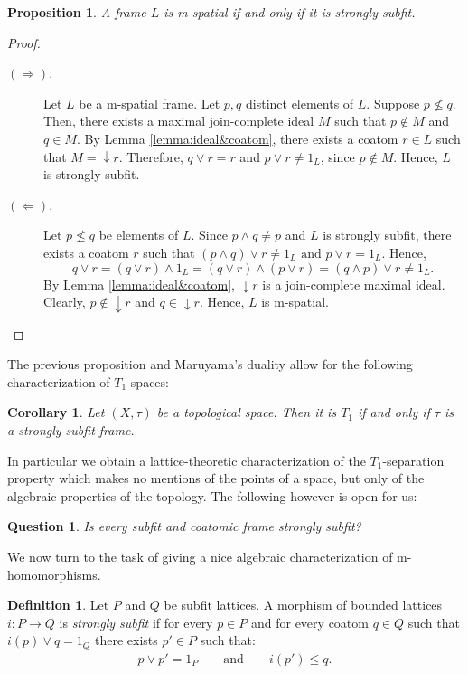 \documentclass{article}
\theoremstyle{plain}
\newtheorem{proposition}[theorem]{Proposition}
\newtheorem{corollary}[theorem]{Corollary}
\newtheorem{question}[theorem]{Question}
\theoremstyle{definition}
\newtheorem{definition}[theorem]{Definition}
\theoremstyle{remark}
\newcommand{\0}{\mathbbm 0}
\newcommand{\1}{\mathbbm 1}
\newcommand{\2}{\mathbbm 2}
\begin{document}
\begin{proposition}
\label{prop:mspatial&stronglysubfit}
A frame $L$ is m-spatial if and only if it is strongly subfit.
\end{proposition}
\begin{proof} \( \)
\begin{description}
    \item[\((\Rightarrow).\)] Let \(L\) be a m-spatial frame. Let \(p,q\) distinct elements of \(L\). Suppose \(p \not \leq q\). Then, there exists a maximal join-complete ideal \(M\) such that \(p \not \in M\) and \(q \in M\). By Lemma \ref{lemma:ideal&coatom}, there exists a coatom \(r \in L\) such that \(M=\downarrow r\). Therefore, \(q \vee r = r\) and \(p \vee r\neq 1_L\), since \(p \notin M\). Hence, \(L\) is strongly subfit. 
    \item[\((\Leftarrow).\)] Let \(p \not \leq q\) be elements of \(L\). 
Since $ p \wedge q \neq p$ and \(L\) is strongly subfit, there exists a  coatom $r$ such that
\((p \wedge q) \vee r\neq  1_L \text{ and } p \vee r = 1_L
\).
Hence,
\[
q \vee r = (q \vee r) \wedge 1_L = (q \vee r) \wedge (p \vee r)
= (q \wedge p) \vee r \neq 1_L.
\]   
 By Lemma \ref{lemma:ideal&coatom}, \(\downarrow r  \) is a join-complete maximal ideal. Clearly, \(p \notin \downarrow r  \) and \(q \in \downarrow r \). Hence, \(L\) is m-spatial. 
\end{description}
\end{proof}

The previous proposition and  Maruyama's duality  allow for the following characterization of $T_1$-spaces: 
\begin{corollary}
    Let \((X,\tau)\) be a topological space. Then it is \(T_1\) if and only if \(\tau\) is a strongly subfit frame.
\end{corollary}
In particular we obtain a lattice-theoretic characterization of the $T_1$-separation property which makes no mentions of the points of a space, but only of the algebraic properties of the topology. The following however is open for us:
\begin{question}
Is every subfit and coatomic frame  strongly subfit?
\end{question}
We now turn to the task of giving a nice algebraic characterization of m-homomorphisms.

\begin{definition}
\label{def:subfit-morphism}
Let $P$ and $Q$ be subfit lattices. A  morphism of bounded lattices $i: P \to Q$ is  \emph{strongly subfit} if for every $p \in P$ and for every coatom $q \in Q$ such that $ i(p) \vee q = 1_Q$ there exists $p' \in P$ such that: \begin{align*}
    p \vee p'=1_P%
\qquad \text{and} \qquad %
 i(p') \leq q.
\end{align*}
 \end{definition}
\end{document}
